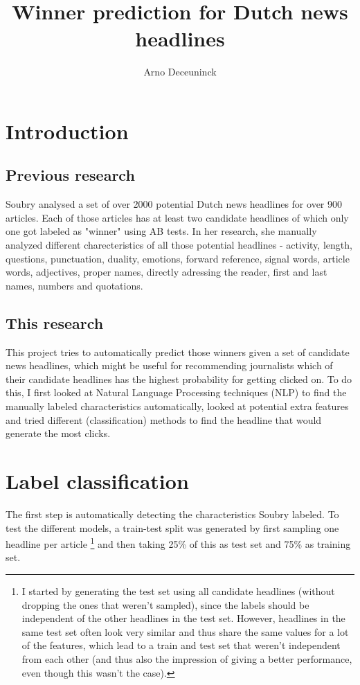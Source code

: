 \documentclass{article}
\title{Winner prediction for Dutch news headlines}
\author{Arno Deceuninck}
\begin{document}
\maketitle

\section{Introduction}
\subsection{Previous research}
Soubry \cite{soubry} analysed a set of over 2000 potential Dutch news headlines for over 900  articles. Each of those articles has at least two candidate headlines of which only one got labeled as "winner" using AB tests. In her research, she manually analyzed different charecteristics of all those potential headlines - activity, length, questions, punctuation, duality, emotions, forward reference, signal words, article words, adjectives, proper names, directly adressing the reader, first and last names, numbers and quotations. \cite{soubry}

\subsection{This research}
This project tries to automatically predict those winners given a set of candidate news headlines, which might be useful for recommending journalists which of their candidate headlines has the highest probability for getting clicked on. To do this, I first looked at Natural Language Processing techniques (NLP) to find the manually labeled characteristics automatically, looked at potential extra features and tried different (classification) methods to find the headline that would generate the most clicks.

\section{Label classification}
The first step is automatically detecting the characteristics Soubry \cite{soubry} labeled. To test the different models, a train-test split was generated by first sampling one headline per article \footnote{I started by generating the test set using all candidate headlines (without dropping the ones that weren't sampled), since the labels should be independent of the other headlines in the test set. However, headlines in the same test set often look very similar and thus share the same values for a lot of the features, which lead to a train and test set that weren't independent from each other (and thus also the impression of giving a better performance, even though this wasn't the case).} and then taking 25\% of this as test set and 75\% as training set.
\end{document}

